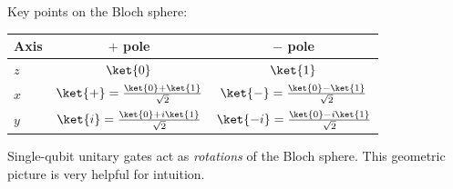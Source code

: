 \documentclass[oneside]{academica}
\begin{document}
Key points on the Bloch sphere:
\begin{center}
  \renewcommand{\arraystretch}{1.3}
  \begin{tabular}{l|c|c}
    \textbf{Axis} & \textbf{$+$ pole} & \textbf{$-$ pole} \\
    \hline
    $z$ & $\ket{0}$ & $\ket{1}$ \\
    $x$ & $\ket{+}=\frac{\ket{0}+\ket{1}}{\sqrt{2}}$ & $\ket{-}=\frac{\ket{0}-\ket{1}}{\sqrt{2}}$ \\
    $y$ & $\ket{i}=\frac{\ket{0}+i\ket{1}}{\sqrt{2}}$ & $\ket{-i}=\frac{\ket{0}-i\ket{1}}{\sqrt{2}}$ \\
  \end{tabular}
\end{center}

Single-qubit unitary gates act as \emph{rotations} of the Bloch sphere.
This geometric picture is very helpful for intuition.
\end{document}
